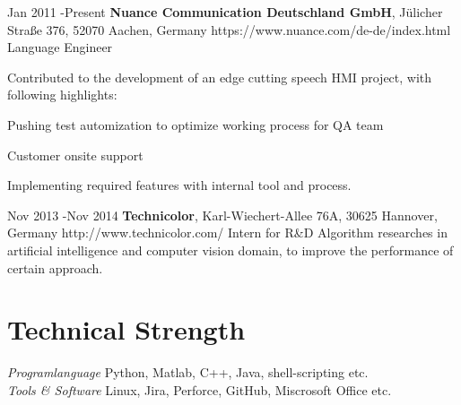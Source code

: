 \documentclass[10pt]{article} %
\begin{document}
\job
{Jan 2011 -}{Present}
{{\bf Nuance Communication Deutschland GmbH}, J\"ulicher Stra\ss e 376, 52070 Aachen, Germany}
{https://www.nuance.com/de-de/index.html}
{Language Engineer}
{Contributed to the development of an edge cutting speech HMI project, with following highlights:
\begin{itemize-noindent}
	\item{Pushing test automization to optimize working process for QA team}
	\item{Customer onsite support}
	\item{Implementing required features with internal tool and process.}
\end{itemize-noindent}}


\job
{Nov 2013 -}{Nov 2014}
{{\bf Technicolor}, Karl-Wiechert-Allee 76A, 30625 Hannover, Germany}
{http://www.technicolor.com/}
{Intern for R\&D}
{Algorithm researches in artificial intelligence and computer vision domain, to improve the performance of certain approach.} 


\section{Technical Strength}

{
\textit{Programlanguage} Python, Matlab, C++, Java, shell-scripting etc.\\
\textit{Tools \& Software} Linux, Jira, Perforce, GitHub, Miscrosoft Office etc.\\
}
\end{document}
